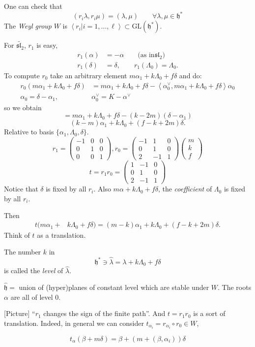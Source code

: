 One can check that
$$
(r_i\lambda,r_i\mu)=(\lambda,\mu)\qquad
\forall \lambda,\mu \in \mathfrak{h}^*
$$
The {\it Weyl group} $W$ is
$\left\langle{}r_i|i=1,\ldots,\ell\right\rangle{}\subset
\text{GL}(\mathfrak{h}^*)$.

\begin{example}
\label{example-Weyl-group-sl2tilde}
For $\widetilde{\mathfrak{sl}_2}$, $r_1$ is
easy,
$$
\begin{aligned}
r_1(\alpha)&=-\alpha \qquad \text{(as in
$\mathfrak{sl}_2$)}\\
r_1(\delta)&=\delta,\qquad
r_1(\Lambda_0)=\Lambda_0.
\end{aligned}
$$
To compute $r_0$ take an arbitrary element $m
\alpha_1+k\Lambda_0+f\delta$ and
do:
$$
\begin{aligned}
r_0(m
\alpha_1+k\Lambda_0+f\delta)&=m\alpha_1+
k\Lambda_0+f\delta
-\left\langle{}\alpha_0^\vee,m\alpha_1+k\Lambda_0+
f\delta\right\rangle{}\alpha_0\\
\alpha_0=\delta-\alpha_1,\qquad &
\alpha_0^\vee=K-\alpha^\vee
\end{aligned}
$$
so we obtain
$$
=m\alpha_1+k\Lambda_0+f\delta-(k-2m)(\delta-
\alpha_1)
$$
$$
(k-m)\alpha_1+k\Lambda_0+(f-k+2m)\delta.
$$
Relative to basis
$\{\alpha_1,\Lambda_0,\delta\}$.
$$
r_1=\begin{pmatrix}
-1&0&0\\
0&1&0\\
0&0&1
\end{pmatrix},
r_0=\begin{pmatrix}
-1&1&0\\
0&1&0\\
2&-1&1
\end{pmatrix}
\begin{pmatrix}
m\\
k\\
f
\end{pmatrix}
$$
$$
t=r_1r_0=\begin{pmatrix}
1&-1&0\\
0&1&0\\
2&-1&1
\end{pmatrix}
$$
Notice that $\delta$ is fixed by all $r_i$.
Also
$m \alpha+k \Lambda_0 +f\delta$, the {\it
coefficient} of $\Lambda_0$ is fixed
by all $r_i$.

Then
$$
\begin{aligned}
t(m\alpha_1+&k\Lambda_0+f\delta)=(m-k)
\alpha_1+k\Lambda_0+(f-k+2m)\delta.
\end{aligned}
$$
Think of $t$ as a translation.

The number $k$ in
 $$
\mathfrak{h}^* \ni
\hat{\lambda}=\lambda+k\Lambda_0+f\delta
$$
is called the {\it level} of $\hat{\lambda}$.

$\hat{\mathfrak{h}}=$ union of (hyper)planes
of constant level which are stable
under $W$. The roots $\alpha$ are all of
level $0$.

[Picture]
``$r_1$ changes the sign of the finite
path''. And $t=r_1r_0$ is a sort of
translation. Indeed, in general we can
consider
$t_{\alpha_i}=r_{\alpha_i}\circ r_0 \in W$,

$$
t_\alpha(\beta+m\delta)=\beta+(m+(\beta,
\alpha_i))\delta
$$
\end{example}
